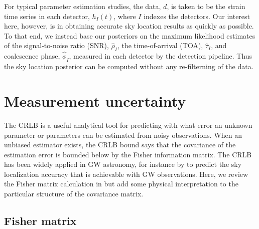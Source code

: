 \documentclass{iopart}
\begin{document}
For typical parameter estimation studies, the data, $d$, is taken to be the strain time series in each detector, $h_I(t)$, where $I$ indexes the detectors. Our interest here, however, is in obtaining accurate sky location results as quickly as possible. To that end, we instead base our posteriors on the maximum likelihood estimates of the signal-to-noise ratio (SNR), $\hat{\rho}_I$, the time-of-arrival (TOA), $\hat{\tau}_I$, and coalescence phase, $\hat{\phi}_I$, measured in each detector by the detection pipeline. Thus the sky location posterior can be computed without any re-filterning of the data.

\section{Measurement uncertainty}

The \ac{CRLB} is a useful analytical tool for predicting with what error an unknown parameter or parameters can be estimated from noisy observations. When an unbiased estimator exists, the \ac{CRLB} bound says that the covariance of the estimation error is bounded below by the Fisher information matrix. The \ac{CRLB} has been widely applied in \ac{GW} astronomy, for instance by \cite{fairhurst:2009} to predict the sky localization accuracy that is achievable with \ac{GW} observations. Here, we review the Fisher matrix calculation in \cite{fairhurst:2009} but add some physical interpretation to the particular structure of the covariance matrix.

\subsection{Fisher matrix}
\end{document}
